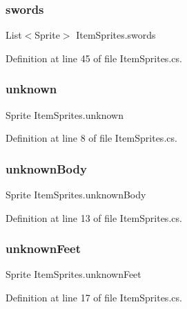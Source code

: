 \subsubsection{\texorpdfstring{swords}{swords}}
{\footnotesize\ttfamily List$<$Sprite$>$ Item\+Sprites.\+swords}



Definition at line 45 of file Item\+Sprites.\+cs.

\mbox{\label{class_item_sprites_a64e9d3883a260484cce4b5c3887aa58c}} 
\subsubsection{\texorpdfstring{unknown}{unknown}}
{\footnotesize\ttfamily Sprite Item\+Sprites.\+unknown}



Definition at line 8 of file Item\+Sprites.\+cs.

\mbox{\label{class_item_sprites_a1593dd2d6c6294269bef009e55f78c86}} 
\subsubsection{\texorpdfstring{unknownBody}{unknownBody}}
{\footnotesize\ttfamily Sprite Item\+Sprites.\+unknown\+Body}



Definition at line 13 of file Item\+Sprites.\+cs.

\mbox{\label{class_item_sprites_ab39b9b1c46696ddbaf1ffeff7ee4e945}} 
\subsubsection{\texorpdfstring{unknownFeet}{unknownFeet}}
{\footnotesize\ttfamily Sprite Item\+Sprites.\+unknown\+Feet}



Definition at line 17 of file Item\+Sprites.\+cs.

\mbox{\label{class_item_sprites_a4e032b4a23e261e05b74abb7de79c08e}} 
